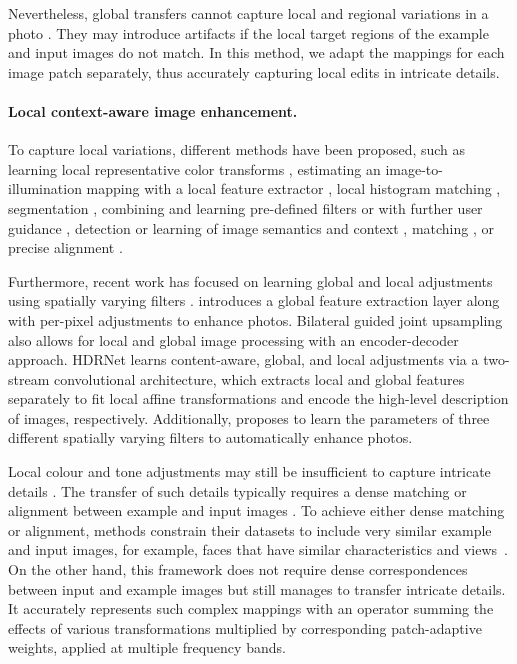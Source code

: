 Nevertheless, global transfers cannot capture local and regional variations in a photo \cite{CohenOr06Color}. They may introduce artifacts if the local target regions of the example and input images do not match. In this method, we adapt the mappings for each image patch separately, thus accurately capturing local edits in intricate details.

\paragraph{Local context-aware image enhancement.} 
To capture local variations, different methods have been proposed, such as learning local representative color transforms \cite{kim2021representative}, estimating an image-to-illumination mapping with a local feature extractor \cite{wang2019underexposed}, local histogram matching \cite{Shapira13Image}, segmentation \cite{Laffont14Transient,Tai07Soft}, combining and learning pre-defined filters \cite{Berthouzoz11AFramework,Chen18Deep,Huang14Parametric,Omiya18Learning,Saeedi18Multimodal} or with further user guidance \cite{An10User,Pouli11Progressive,Tai05Local}, detection or learning of image semantics and context \cite{Gharbi17Deep,Hwang12Context,Kaufman12Content,Nam17Deep,Yan14Automatic,Zhu18Automatic}, matching \cite{HaCohen11Nonrigid}, or precise alignment \cite{Kagarlitsky09Piecewise, Shih13Data}.

Furthermore, recent work has focused on learning global and local adjustments using spatially varying filters \cite{moran2020deeplpf, Gharbi17Deep, chen2018deep, shaham2021spatially, li2020lapar}. \citeauthor{chen2018deep} \cite{chen2018deep} introduces a global feature extraction layer along with per-pixel adjustments to enhance photos. Bilateral guided joint upsampling \cite{chen2016bilateral} also allows for local and global image processing with an encoder-decoder approach. HDRNet \cite{Gharbi17Deep} learns content-aware, global, and local adjustments via a two-stream convolutional architecture, which extracts local and global features separately to fit local affine transformations and encode the high-level description of images, respectively. Additionally, \citeauthor{moran2020deeplpf} \cite{moran2020deeplpf} proposes to learn the parameters of three different spatially varying filters to automatically enhance photos.

Local colour and tone adjustments may still be insufficient to capture intricate details \cite{Bae06Two}. The transfer of such details typically requires a dense matching \cite{HaCohen11Nonrigid} or alignment between example and input images \cite{Shih14Style}. To achieve either dense matching or alignment, methods constrain their datasets to include very similar example and input images, for example, faces that have similar characteristics and views~\cite{Shih14Style}. On the other hand, this framework does not require dense correspondences between input and example images but still manages to transfer intricate details. It accurately represents such complex mappings with an operator summing the effects of various transformations multiplied by corresponding patch-adaptive weights, applied at multiple frequency bands.

